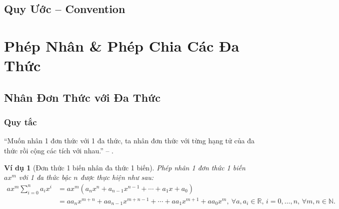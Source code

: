 \documentclass{article}
\numberwithin{equation}{section}
\newtheorem{vidu}{Ví dụ}[section]
\begin{document}
\subsection*{Quy Ước -- Convention}


\section{Phép Nhân \& Phép Chia Các Đa Thức}

\subsection{Nhân Đơn Thức với Đa Thức}

\subsubsection{Quy tắc}
``Muốn nhân 1 đơn thức với 1 đa thức, ta nhân đơn thức với từng hạng tử của đa thức rồi cộng các tích với nhau.'' -- \cite[p. 4]{SGK_Toan_8_tap_1}.

\begin{vidu}[Đơn thức 1 biến nhân đa thức 1 biến]
	Phép nhân 1 đơn thức 1 biến $ax^m$ với 1 đa thức bậc $n$ được thực hiện như sau:
	\begin{align*}
		ax^m\sum_{i=0}^n a_ix^i &= ax^m\left(a_nx^n + a_{n-1}x^{n-1} + \cdots + a_1x + a_0\right)\\
		&= aa_nx^{m+n} + aa_{n-1}x^{m+ n-1} + \cdots + aa_1x^{m+1} + aa_0x^m,\ \forall a,a_i\in\mathbb{R},\,i = 0,\ldots,n,\,\forall m,n\in\mathbb{N}.
	\end{align*}
\end{vidu}
\end{document}
